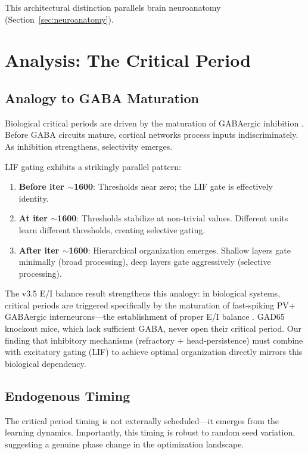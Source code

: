 \documentclass[11pt]{article}
\begin{document}
This architectural distinction parallels brain neuroanatomy (Section~\ref{sec:neuroanatomy}).


\section{Analysis: The Critical Period}
\label{sec:critical-period}

\subsection{Analogy to GABA Maturation}

Biological critical periods are driven by the maturation of GABAergic inhibition \cite{hensch2005critical}. Before GABA circuits mature, cortical networks process inputs indiscriminately. As inhibition strengthens, selectivity emerges.

LIF gating exhibits a strikingly parallel pattern:
\begin{enumerate}
    \item \textbf{Before iter $\sim$1600}: Thresholds near zero; the LIF gate is effectively identity.
    \item \textbf{At iter $\sim$1600}: Thresholds stabilize at non-trivial values. Different units learn different thresholds, creating selective gating.
    \item \textbf{After iter $\sim$1600}: Hierarchical organization emerges. Shallow layers gate minimally (broad processing), deep layers gate aggressively (selective processing).
\end{enumerate}

The v3.5 E/I balance result strengthens this analogy: in biological systems, critical periods are triggered specifically by the maturation of fast-spiking PV+ GABAergic interneurons---the establishment of proper E/I balance \cite{hensch2005critical}. GAD65 knockout mice, which lack sufficient GABA, never open their critical period. Our finding that inhibitory mechanisms (refractory + head-persistence) must combine with excitatory gating (LIF) to achieve optimal organization directly mirrors this biological dependency.

\subsection{Endogenous Timing}

The critical period timing is not externally scheduled---it emerges from the learning dynamics. Importantly, this timing is robust to random seed variation, suggesting a genuine phase change in the optimization landscape.
\end{document}
